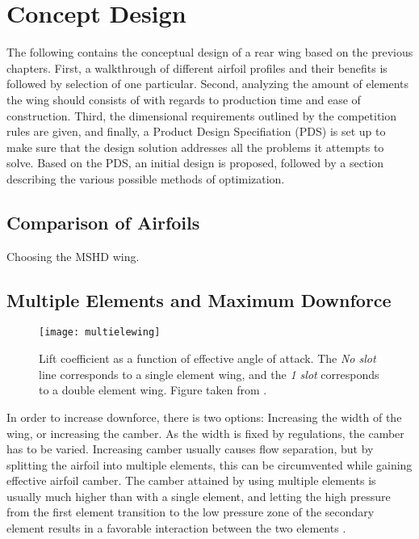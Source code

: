 \chapter{Concept Design}

  The following contains the conceptual design of a rear wing based on the previous chapters. First, a walkthrough of different airfoil profiles and their benefits is followed by selection of one particular. Second, analyzing the amount of elements the wing should consists of with regards to production time and ease of construction. Third, the dimensional requirements outlined by the competition rules are given, and finally, a Product Design Specifiation (PDS) is set up to make sure that the design solution addresses all the problems it attempts to solve. Based on the PDS, an initial design is proposed, followed by a section describing the various possible methods of optimization.

  \section{Comparison of Airfoils}

    Choosing the MSHD wing.

  \section{Multiple Elements and Maximum Downforce}

    \begin{figure}
      \texttt{[image: multielewing]}
      \caption{Lift coefficient as a function of effective angle of attack. The \emph{No slot} line corresponds to a single element wing, and the \emph{1 slot} corresponds to a double element wing. Figure taken from \cite{jkatz}.}
      \label{fig:multielewing}
    \end{figure}

    In order to increase downforce, there is two options: Increasing the width of the wing, or increasing the camber. As the width is fixed by regulations, the camber has to be varied. Increasing camber usually causes flow separation, but by splitting the airfoil into multiple elements, this can be circumvented while gaining effective airfoil camber. The camber attained by using multiple elements is usually much higher than with a single element, and letting the high pressure from the first element transition to the low pressure zone of the secondary element results in a favorable interaction between the two elements .

